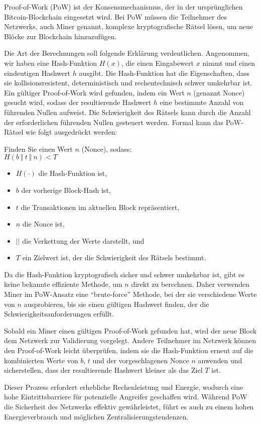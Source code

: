 Proof-of-Work (PoW) ist der Konsensmechanismus, der in der ursprünglichen Bitcoin-Blockchain eingesetzt wird. Bei PoW müssen die Teilnehmer des Netzwerks, auch Miner genannt, komplexe kryptografische Rätsel lösen, um neue Blöcke zur Blockchain hinzuzufügen. 

Die Art der Berechnungen soll folgende Erklärung verdeutlichen. Angenommen, wir haben eine Hash-Funktion $H(x)$, die einen Eingabewert $x$ nimmt und einen eindeutigen Hashwert $h$ ausgibt. Die Hash-Funktion hat die Eigenschaften, dass sie kollisionsresistent, deterministisch und rechentechnisch schwer umkehrbar ist.
Ein gültiger Proof-of-Work wird gefunden, indem ein Wert $n$ (genannt Nonce) gesucht wird, sodass der resultierende Hashwert $h$ eine bestimmte Anzahl von führenden Nullen aufweist. Die Schwierigkeit des Rätsels kann durch die Anzahl der erforderlichen führenden Nullen gesteuert werden. Formal kann das PoW-Rätsel wie folgt ausgedrückt werden:

Finden Sie einen Wert $n$ (Nonce), sodass: \\
$H(b \ \Vert \ t \ \Vert \ n) < T$
\begin{itemize}
\item $H(\cdot)$ die Hash-Funktion ist,
\item $b$ der vorherige Block-Hash ist,
\item $t$ die Transaktionen im aktuellen Block repräsentiert,
\item $n$ die Nonce ist,
\item $||$ die Verkettung der Werte darstellt, und
\item $T$ ein Zielwert ist, der die Schwierigkeit des Rätsels bestimmt.
\end{itemize}
Da die Hash-Funktion kryptografisch sicher und schwer umkehrbar ist, gibt es keine bekannte effiziente Methode, um $n$ direkt zu berechnen. Daher verwenden Miner im PoW-Ansatz eine \enquote{brute-force} Methode, bei der sie verschiedene Werte von $n$ ausprobieren, bis sie einen gültigen Hashwert finden, der die Schwierigkeitsanforderungen erfüllt.

Sobald ein Miner einen gültigen Proof-of-Work gefunden hat, wird der neue Block dem Netzwerk zur Validierung vorgelegt. Andere Teilnehmer im Netzwerk können den Proof-of-Work leicht überprüfen, indem sie die Hash-Funktion erneut auf die kombinierten Werte von $b$, $t$ und der vorgeschlagenen Nonce $n$ anwenden und sicherstellen, dass der resultierende Hashwert kleiner als das Ziel $T$ ist.

Dieser Prozess erfordert erhebliche Rechenleistung und Energie, wodurch eine hohe Eintrittsbarriere für potenzielle Angreifer geschaffen wird. Während PoW die Sicherheit des Netzwerks effektiv gewährleistet, führt es auch zu einem hohen Energieverbrauch und möglichen Zentralisierungstendenzen.


